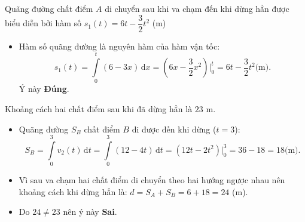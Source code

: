 \begin{ex}[]
{\begin{itemchoice}
			\itemch Quãng đường chất điểm $A$ di chuyển sau khi va chạm đến khi dừng hẳn được biểu diễn bởi hàm số $s_{1}(t)=6t-\dfrac{3}{2}t^{2}$ (m)
			\begin{itemize}
				\item Hàm số quãng đường là nguyên hàm của hàm vận tốc:
				$$s_1(t) = \displaystyle\int\limits_{0}^{t} (6 - 3x) \mathrm{\,d}x = \left(6x - \dfrac{3}{2}x^2\right)\bigg|_0^t = 6t - \dfrac{3}{2}t^2 \text{(m)}.$$
				 Ý này \textbf{Đúng}.
			\end{itemize}
			
			\itemch Khoảng cách hai chất điểm sau khi đã dừng hẳn là $23$ m.
			\begin{itemize}
				\item Quãng đường $S_B$ chất điểm $B$ đi được đến khi dừng ($t=3$):
				$$S_B = \displaystyle\int\limits_{0}^{3} v_2(t) \mathrm{\,d}t = \displaystyle\int\limits_{0}^{3} (12 - 4t) \mathrm{\,d}t = \left(12t - 2t^2\right)\bigg|_0^3 = 36 - 18 = 18 \text{(m)}.$$
				\item Vì sau va chạm hai chất điểm di chuyển theo hai hướng ngược nhau nên khoảng cách khi dừng hẳn là:
				$d = S_A + S_B = 6 + 18 = 24$ (m).
				\item Do $24 \neq 23$ nên ý này \textbf{Sai}.
			\end{itemize}
		\end{itemchoice}
	}
\end{ex}

